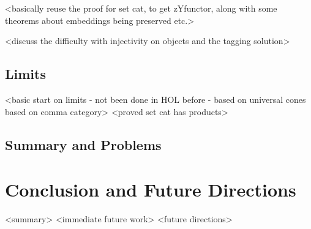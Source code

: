 \documentclass[twoside,titlepage,11pt]{article}
\begin{document}
<basically reuse the proof for set cat, to get zYfunctor, along with some theorems about embeddings being preserved etc.>

<discuss the difficulty with injectivity on objects and the tagging solution>
\subsection{Limits}%
<basic start on limits - not been done in HOL before - based on universal cones based on comma category>
<proved set cat has products>
\subsection{Summary and Problems}%
\section{Conclusion and Future Directions}%
<summary>%
<immediate future work>%
<future directions>%


\end{document}
